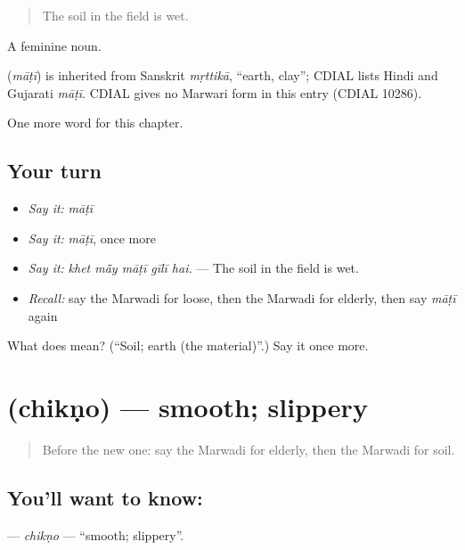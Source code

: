 \begin{quote}
The soil in the field is wet.
\end{quote}

A feminine noun.

\begin{cousinweb}
\textbf{} (\emph{māṭī}) is inherited from Sanskrit \emph{mṛttikā}, \textquotedblleft{}earth, clay\textquotedblright{}; CDIAL lists Hindi and Gujarati \emph{māṭī}. CDIAL gives no Marwari form in this entry (CDIAL 10286).
\end{cousinweb}

\begin{grammarlens}[title={What you've built}]
One more word for this chapter.
\end{grammarlens}

\subsection*{Your turn}
\begin{itemize}
\raggedright
  \item \emph{Say it:} \emph{māṭī}
  \item \emph{Say it:} \emph{māṭī}, once more
  \item \emph{Say it:} \emph{khet mā̃y māṭī gīlī hai.} — The soil in the field is wet.
  \item \emph{Recall:} say the Marwadi for loose, then the Marwadi for elderly, then say \emph{māṭī} again
\end{itemize}

\begin{tcolorbox}[breakable,colback=teal!4,colframe=teal!35!black,title={Before you move on}]
What does  mean? (\textquotedblleft{}Soil; earth (the material)\textquotedblright{}.) Say it once more.
\end{tcolorbox}
\section[\texorpdfstring{\mw{चिकणो} (chikṇo)}{चिकणो (chikṇo)}]{ (chikṇo) — smooth; slippery}

\label{lesson:MW-C232-chikno}



\begin{quote}
Before the new one: say the Marwadi for elderly, then the Marwadi for soil.
\end{quote}

\subsection*{You'll want to know: }
\textbf{} — \emph{chikṇo} — \textquotedblleft{}smooth; slippery\textquotedblright{}.

